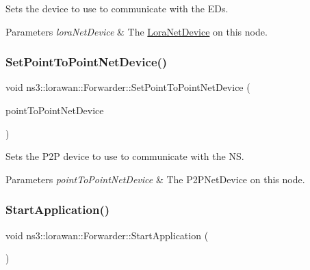 Sets the device to use to communicate with the E\+Ds.


\begin{DoxyParams}{Parameters}
{\em lora\+Net\+Device} & The \hyperlink{classns3_1_1lorawan_1_1LoraNetDevice}{Lora\+Net\+Device} on this node. \\
\hline
\end{DoxyParams}
\mbox{\label{classns3_1_1lorawan_1_1Forwarder_a05e97fcfcdeafe425477f6e0c06509f8}} 
\subsubsection{\texorpdfstring{Set\+Point\+To\+Point\+Net\+Device()}{SetPointToPointNetDevice()}}
{\footnotesize\ttfamily void ns3\+::lorawan\+::\+Forwarder\+::\+Set\+Point\+To\+Point\+Net\+Device (\begin{DoxyParamCaption}\item[{Ptr$<$ Point\+To\+Point\+Net\+Device $>$}]{point\+To\+Point\+Net\+Device }\end{DoxyParamCaption})}

Sets the P2P device to use to communicate with the NS.


\begin{DoxyParams}{Parameters}
{\em point\+To\+Point\+Net\+Device} & The P2\+P\+Net\+Device on this node. \\
\hline
\end{DoxyParams}
\mbox{\label{classns3_1_1lorawan_1_1Forwarder_ae94ef5057f8c5fb01db2c6c7ed17eb9d}} 
\subsubsection{\texorpdfstring{Start\+Application()}{StartApplication()}}
{\footnotesize\ttfamily void ns3\+::lorawan\+::\+Forwarder\+::\+Start\+Application (\begin{DoxyParamCaption}\item[{void}]{ }\end{DoxyParamCaption})}

